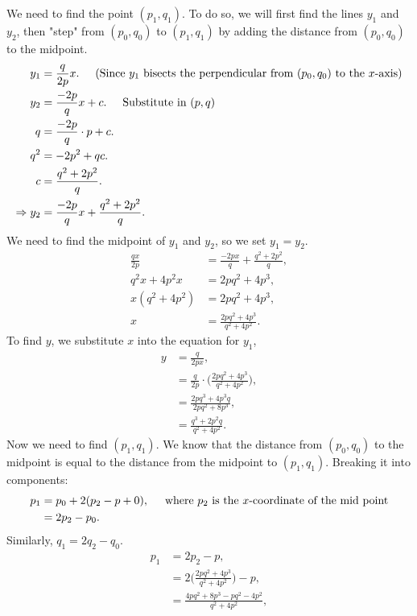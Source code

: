 \documentclass{amsart}
\theoremstyle{definition}
\theoremstyle{remark}
\begin{document}
\begin{enumerate}
\begin{enumerate}
We need to find the point $(p_1,q_1)$. To do so, we will first find the lines $y_1$ and $y_2$, then "step" from $(p_0,q_0)$ to $(p_1,q_1)$ by adding the distance from $(p_0,q_0)$ to the midpoint.
\begin{align*}
y_1 &= \frac{q}{2p}x. \hspace{0.5cm} \text{(Since } y_1 \text{ bisects the perpendicular from } (p_0,q_0) \text{ to the } x \text{-axis)}\\
y_2 &= \frac{-2p}{q}x + c. \hspace{0.5cm} \text{Substitute in } (p,q)\\
q &= \frac{-2p}{q} \cdot p + c.\\
q^2 &= -2p^2 + qc.\\
c &= \frac{q^2+2p^2}{q}.\\
\Rightarrow y_2 &= \frac{-2p}{q}x + \frac{q^2 + 2p^2}{q}.
\end{align*}
We need to find the midpoint of $y_1$ and $y_2$, so we set $y_1 = y_2$.
\begin{align*}
\frac{qx}{2p} &= \frac{-2px}{q} + \frac{q^2+2p^2}{q},\\
q^2x+4p^2x &= 2pq^2 +4p^3,\\
x(q^2+4p^2) &= 2pq^2+4p^3,\\
x &= \frac{2pq^2 +4p^3}{q^2+4p^2}.
\end{align*}
To find $y$, we substitute $x$ into the equation for $y_1$,
\begin{align*}
y &= \frac{q}{2px},\\
&= \frac{q}{2p} \cdot \bigg( \frac{2pq^2 + 4p^3}{q^2+4p^2} \bigg),\\
&= \frac{2pq^3+4p^3q}{2pq^2+8p^3},\\
&= \frac{q^3+2p^2q}{q^2+4p^2}.
\end{align*}
Now we need to find $(p_1,q_1)$. We know that the distance from $(p_0,q_0)$ to the midpoint is equal to the distance from the midpoint to $(p_1,q_1)$. Breaking it into components:
\begin{align*}
p_1 &= p_0 + 2(p_2-p+0), \hspace{0.5cm} \text{where } p_2 \text{ is the } x \text{-coordinate of the mid point}\\
&= 2p_2 - p_0.
\end{align*}
Similarly, $q_1 = 2q_2 - q_0$.
\begin{align*}
p_1 &= 2p_2-p,\\
&= 2 \bigg( \frac{2pq^2 + 4p^3}{q^2+4p^2} \bigg) - p,\\
&= \frac{4pq^2 + 8p^3 - pq^2 - 4p^2}{q^2+4p^2},\\

\end{align*}
\end{enumerate}
\end{enumerate}
\end{document}
